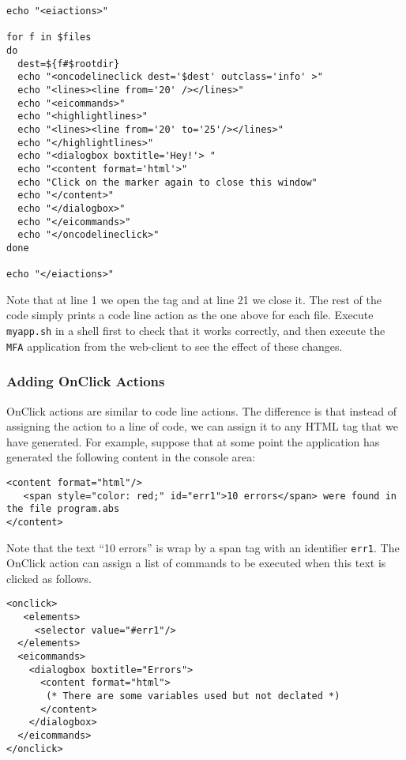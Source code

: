 \medskip
\begin{lstlisting}[style=script]
echo "<eiactions>"

for f in $files 
do
  dest=${f#$rootdir}
  echo "<oncodelineclick dest='$dest' outclass='info' >"
  echo "<lines><line from='20' /></lines>"
  echo "<eicommands>"
  echo "<highlightlines>"
  echo "<lines><line from='20' to='25'/></lines>"
  echo "</highlightlines>"
  echo "<dialogbox boxtitle='Hey!'> "
  echo "<content format='html'>"
  echo "Click on the marker again to close this window"
  echo "</content>"
  echo "</dialogbox>"
  echo "</eicommands>"
  echo "</oncodelineclick>"
done

echo "</eiactions>"
\end{lstlisting}


\medskip
\noindent
Note that at line 1 we open the tag  and at line 21 we
close it. The rest of the code simply prints a code line action as the
one above for each file.
%
Execute \texttt{myapp.sh} in a shell first to check that it works
correctly, and then execute the \texttt{MFA} application from the
web-client to see the effect of these changes.

\subsubsection{Adding OnClick Actions}

OnClick actions are similar to code line actions. The difference is
that instead of assigning the action to a line of code, we can assign
it to any HTML tag that we have generated.
%
For example, suppose that at some point the application has generated
the following content in the console area:

\medskip
\begin{lstlisting}
<content format="html"/>
   <span style="color: red;" id="err1">10 errors</span> were found in the file program.abs
</content>
\end{lstlisting}

\medskip
\noindent
Note that the text ``10 errors'' is wrap by a span tag with an
identifier \texttt{err1}. The OnClick action can assign a list of
commands to be executed when this text is clicked as follows.

\begin{lstlisting}
<onclick>
   <elements>
     <selector value="#err1"/>
  </elements>
  <eicommands>
    <dialogbox boxtitle="Errors"> 
      <content format="html">
       (* There are some variables used but not declated *)
      </content>
    </dialogbox>
  </eicommands>
</onclick>
\end{lstlisting}

